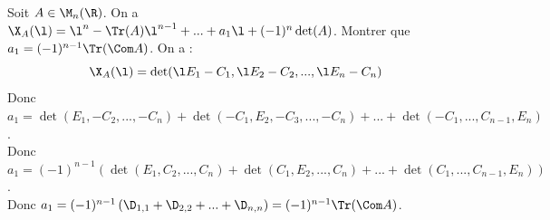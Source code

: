 \documentclass[11pt]{article}
\begin{document}
\begin{exercice}{}{}
    Soit $A\in\M_n(\R)$. On a $\X_A(\l)=\l^n-\Tr(A)\l^{n-1}+...+a_1\l + (-1)^n\det(A)$. Montrer que $a_1=(-1)^{n-1}\Tr(\Com A)$.
    \tcblower
    On a :
    \begin{equation*}
        \X_A(\l) = \det(\l E_1 - C_1, \l E_2 - C_2,...,\l E_n - C_n)
    \end{equation*}
    Donc $a_1=\det(E_1, - C_2, ..., - C_n) + \det(-C_1, E_2, -C_3, ..., -C_n) + ... + \det(-C_1,...,C_{n-1},E_n)$.\\
    Donc $a_1=(-1)^{n-1}\left(\det(E_1,C_2,...,C_n)+\det(C_1,E_2,...,C_n)+...+\det(C_1,...,C_{n-1},E_n)\right)$.\\
    Donc $a_1=(-1)^{n-1}\left(\D_{1,1}+\D_{2,2}+...+\D_{n,n}\right)=(-1)^{n-1}\Tr(\Com A)$.
\end{exercice}
\end{document}
